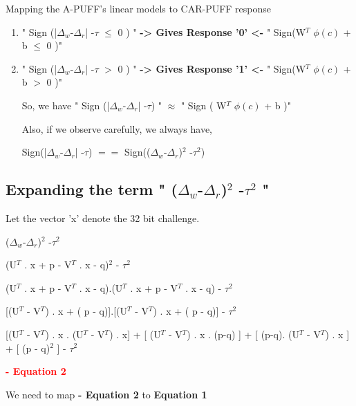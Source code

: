 \documentclass[11 pt]{article}
\begin{document}
{\vspace{0.33 cm} 

Mapping the A-PUFF's linear models to CAR-PUFF response
\begin{enumerate} 
\item " Sign (|$\Delta$$_w$-$\Delta$$_r$| -$\tau$ $\leq$ $ 0$ ) " \textbf{-> Gives Response '0' <-} " Sign(W$^T$ $\phi(c)$  + b $\leq$ $ 0$ )"
\item " Sign (|$\Delta$$_w$-$\Delta$$_r$| -$\tau$ $>$ $ 0$ ) " \textbf{-> Gives Response '1' <-} " Sign(W$^T$ $\phi(c)$  + b $>$ $ 0$ )"

\vspace{0.33 cm}

{\Large So, we have " Sign (|$\Delta$$_w$-$\Delta$$_r$| -$\tau$) "   $ \approx $  " Sign ( W$^T$ $\phi(c)$  + b )" } 

\vspace{0.63 cm}
Also, if we observe carefully, we always have,
\vspace{0.33 cm}

{\Large Sign(|$\Delta$$_w$-$\Delta$$_r$| -$\tau$)  $  ==  $   Sign(($\Delta$$_w$-$\Delta$$_r$)$^2$ -$\tau$$^2$)  }

\end{enumerate} 
\vspace{0.63 cm}


\subsection{ Expanding the term " ($\Delta$$_w$-$\Delta$$_r$)$^2$ -$\tau$$^2$ " }


Let the vector 'x' denote the 32 bit challenge.

($\Delta$$_w$-$\Delta$$_r$)$^2$ -$\tau$$^2$ 

(U$^T$ . x  + p - V$^T$ . x  - q)$^2$ - $\tau$$^2$  

(U$^T$ . x  + p - V$^T$ . x  - q).(U$^T$ . x  + p - V$^T$ . x  - q) - $\tau$$^2$ 

[(U$^T$ -  V$^T$) . x + ( p - q)].[(U$^T$ -  V$^T$) . x + ( p - q)] - $\tau$$^2$ 

[(U$^T$ -  V$^T$) . x . (U$^T$ -  V$^T$) . x] + [ (U$^T$ -  V$^T$) . x . (p-q) ] +  [ (p-q). (U$^T$ -  V$^T$) . x ] + [ (p - q)$^2$ ] - $\tau$$^2$ 

\begin{flushright} \textbf{\textcolor{red}{- Equation 2}} \end{flushright}

We need to map \textbf{- Equation 2 } to \textbf{ Equation 1}

}
\end{document}
